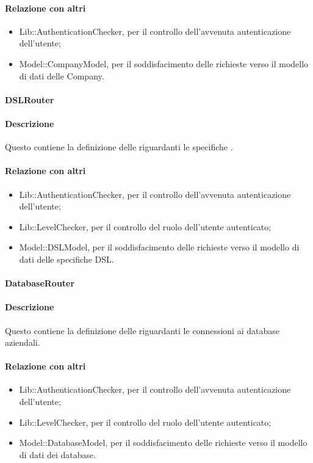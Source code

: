 \paragraph*{Relazione con altri }
\begin{itemize}
\item Lib::AuthenticationChecker, per il controllo dell'avvenuta autenticazione dell'utente;
\item Model::CompanyModel, per il soddisfacimento delle richieste verso il modello di dati delle Company.
\end{itemize}

\paragraph{DSLRouter}
\paragraph*{Descrizione}
Questo  contiene la definizione delle  riguardanti le specifiche .

\paragraph*{Relazione con altri }
\begin{itemize}
\item Lib::AuthenticationChecker, per il controllo dell'avvenuta autenticazione dell'utente;
\item Lib::LevelChecker, per il controllo del ruolo dell'utente autenticato;
\item Model::DSLModel, per il soddisfacimento delle richieste verso il modello di dati delle specifiche DSL.
\end{itemize}

\paragraph{DatabaseRouter}
\paragraph*{Descrizione}
Questo  contiene la definizione delle  riguardanti le connessioni ai database aziendali.

\paragraph*{Relazione con altri }
\begin{itemize}
\item Lib::AuthenticationChecker, per il controllo dell'avvenuta autenticazione dell'utente;
\item Lib::LevelChecker, per il controllo del ruolo dell'utente autenticato;
\item Model::DatabaseModel, per il soddisfacimento delle richieste verso il modello di dati dei database.
\end{itemize}


